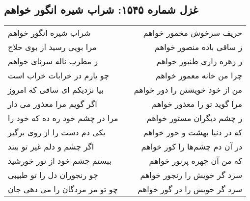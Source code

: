 \begin{center}
\section*{غزل شماره ۱۵۴۵: شراب شیره انگور خواهم}
\label{sec:1545}
\begin{longtable}{l p{0.5cm} r}
شراب شیره انگور خواهم
&&
حریف سرخوش مخمور خواهم
\\
مرا بویی رسید از بوی حلاج
&&
ز ساقی باده منصور خواهم
\\
ز مطرب ناله سرنای خواهم
&&
ز زهره زاری طنبور خواهم
\\
چو یارم در خرابات خراب است
&&
چرا من خانه معمور خواهم
\\
بیا نزدیکم ای ساقی که امروز
&&
من از خود خویشتن را دور خواهم
\\
اگر گویم مرا معذور می دار
&&
مرا گوید تو را معذور خواهم
\\
مرا در چشم خود ره ده که خود را
&&
ز چشم دیگران مستور خواهم
\\
یکی دم دست را از روی برگیر
&&
که در دنیا بهشت و حور خواهم
\\
اگر چشم و دلم غیر تو بیند
&&
در آن دم چشم‌ها را کور خواهم
\\
ببستم چشم خود از نور خورشید
&&
که من آن چهره پرنور خواهم
\\
چو رنجوران دل را تو طبیبی
&&
سزد گر خویش را رنجور خواهم
\\
چو تو مر مردگان را می دهی جان
&&
سزد گر خویش را در گور خواهم
\\
\end{longtable}
\end{center}
